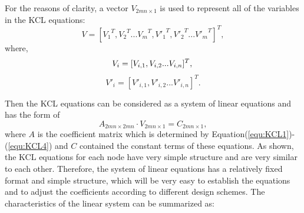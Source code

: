 For the reasons of clarity, a vector ${V}_{2mn\times 1}$ is used to represent all of the variables in the KCL equations:
\begin{equation}\label{equ:V1}
{V}=[{V_1}^T,{V_2}^T...{V_m}^T,{V'_1}^T,{V'_2}^T...{V'_m}^T]^T,
\end{equation}
where,
\begin{equation}\label{equ:V2}
{V_i} = [V_{i,1},V_{i,2}...V_{i,n}]^T,\\
\end{equation}
\begin{equation}\label{equ:V3}
{V'_i} = [V'_{i,1},V'_{i,2}...V'_{i,n}]^T.
\end{equation}

Then the KCL equations can be considered as a system of linear equations and has the form of
\begin{equation}\label{equ:matrix}
A_{2mn\times{2mn}}\cdot V_{2mn\times{1}} = C_{2mn\times{1}},
\end{equation}
where $A$ is the coefficient matrix which is determined by Equation(\ref{equ:KCL1})-(\ref{equ:KCL4}) and $C$ contained the constant terms of these equations. As shown, the KCL equations for each node have very simple structure and are very similar to each other. Therefore, the system of linear equations has a relatively fixed format and simple structure, which will be very easy to establish the equations and to adjust the coefficients according to different design schemes. The characteristics of the linear system can be summarized as:

